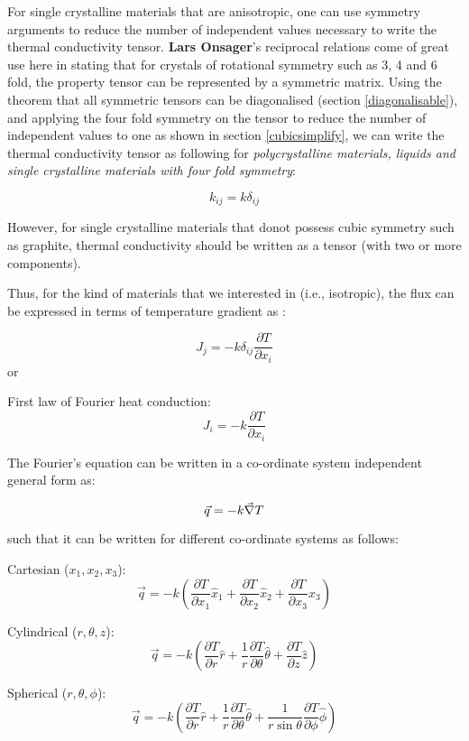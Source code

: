 For single crystalline materials that are anisotropic, one can use symmetry arguments to reduce the number of independent values necessary to write the thermal conductivity tensor. \textbf{Lars Onsager}'s reciprocal relations come of great use here in stating that for crystals of rotational symmetry such as 3, 4 and 6 fold, the property tensor can be represented by a symmetric matrix. Using the theorem that all symmetric tensors can be diagonalised (section \ref{diagonalisable}), and applying the four fold symmetry on the tensor to reduce the number of independent values to one as shown in section \ref{cubicsimplify}, we can write the thermal conductivity tensor as following for \textit{polycrystalline materials, liquids and single crystalline materials with four fold symmetry}:

$$ k_{ij} = k \delta_{ij}$$

However, for single crystalline materials that donot possess cubic symmetry such as graphite, thermal conductivity should be written as a tensor (with two or more components).

Thus, for the kind of materials that we interested in (i.e., isotropic), the flux can be expressed in terms of temperature gradient as :

$$ J_j = -k \delta_{ij} \frac{\partial T}{\partial x_i} $$
or

First law of Fourier heat conduction:
\begin{equation}
\boxed{
 J_i = -k \frac{\partial T}{\partial x_i}
}
\label{fourierf}
\end{equation}


The Fourier's equation can be written in a co-ordinate system independent general form as:

$$ \vec{q} = -k \vec{\nabla} T$$

such that it can be written for different co-ordinate systems as follows:

Cartesian ($x_1,x_2,x_3$):
$$ \vec{q} = -k\left( \frac{\partial T}{\partial x_1} \hat{x}_1 + \frac{\partial T}{\partial x_2} \hat{x}_2 + \frac{\partial T}{\partial x_3} \hat{x}_3 \right) $$


Cylindrical ($r,\theta,z$):
$$ \vec{q} = -k\left( \frac{\partial T}{\partial r} \hat{r} + \frac{1}{r} \frac{\partial T}{\partial \theta} \hat{\theta} + \frac{\partial T}{\partial z} \hat{z} \right) $$

Spherical ($r,\theta,\phi$):
$$ \vec{q} = -k\left( \frac{\partial T}{\partial r} \hat{r} + \frac{1}{r} \frac{\partial T}{\partial \theta} \hat{\theta} + \frac{1}{r \sin\theta}\frac{\partial T}{\partial \phi} \hat{\phi} \right) $$

